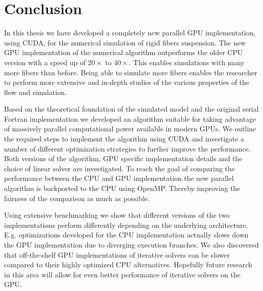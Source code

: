 \chapter{Conclusion}

In this thesis we have developed a completely new parallel GPU implementation, using CUDA, for the numerical simulation of rigid fibers suspension. The new GPU implementation of the numerical algorithm outperforms the older CPU version with a speed up of $20×$ to $40×$. This enables simulations with many more fibers than before. Being able to simulate more fibers enables the researcher to perform more extensive and in-depth studies of the various properties of the flow and simulation.

Based on the theoretical foundation of the simulated model and the original serial Fortran implementation we developed an algorithm suitable for taking advantage of massively parallel computational power available in modern GPUs. We outline the required steps to implement the algorithm using CUDA and investigate a number of different optimization strategies to further improve the performance. Both versions of the algorithm, GPU specific implementation details and the choice of linear solver are investigated. To reach the goal of comparing the performance between the CPU and GPU implementation the new parallel algorithm is backported to the CPU using OpenMP. Thereby improving the fairness of the comparison as much as possible.

Using extensive benchmarking we show that different versions of the two implementations perform differently depending on the underlying architecture. E.g. optimizations developed for the CPU implementation actually slows down the GPU implementation due to diverging execution branches. We also discovered that off-the-shelf GPU implementations of iterative solvers can be slower compared to their highly optimized CPU alternatives. Hopefully future research in this area will allow for even better performance of iterative solvers on the GPU.

